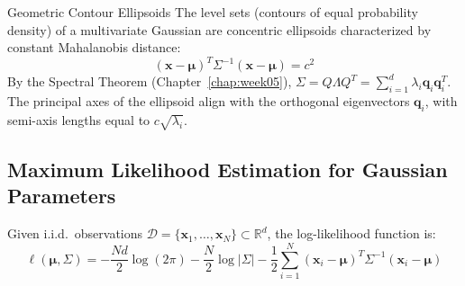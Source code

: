 \begin{theorembox}{Geometric Contour Ellipsoids}
The level sets (contours of equal probability density) of a multivariate Gaussian are concentric ellipsoids characterized by constant Mahalanobis distance:
\begin{equation}
(\mathbf{x} - \boldsymbol{\mu})^T \Sigma^{-1} (\mathbf{x} - \boldsymbol{\mu}) = c^2
\label{eq:mahalanobis_ellipsoid}
\end{equation}
By the Spectral Theorem (Chapter~\ref{chap:week05}), $\Sigma = Q \Lambda Q^T = \sum_{i=1}^d \lambda_i \mathbf{q}_i \mathbf{q}_i^T$. The principal axes of the ellipsoid align with the orthogonal eigenvectors $\mathbf{q}_i$, with semi-axis lengths equal to $c\sqrt{\lambda_i}$.
\end{theorembox}

\subsection{Maximum Likelihood Estimation for Gaussian Parameters}
Given i.i.d.\ observations $\mathcal{D} = \{\mathbf{x}_1, \dots, \mathbf{x}_N\} \subset \mathbb{R}^d$, the log-likelihood function is:
\begin{equation}
\ell(\boldsymbol{\mu}, \Sigma) = -\frac{N d}{2}\log(2\pi) - \frac{N}{2}\log|\Sigma| - \frac{1}{2}\sum_{i=1}^N (\mathbf{x}_i - \boldsymbol{\mu})^T \Sigma^{-1} (\mathbf{x}_i - \boldsymbol{\mu})
\label{eq:mle_loglik}
\end{equation}

